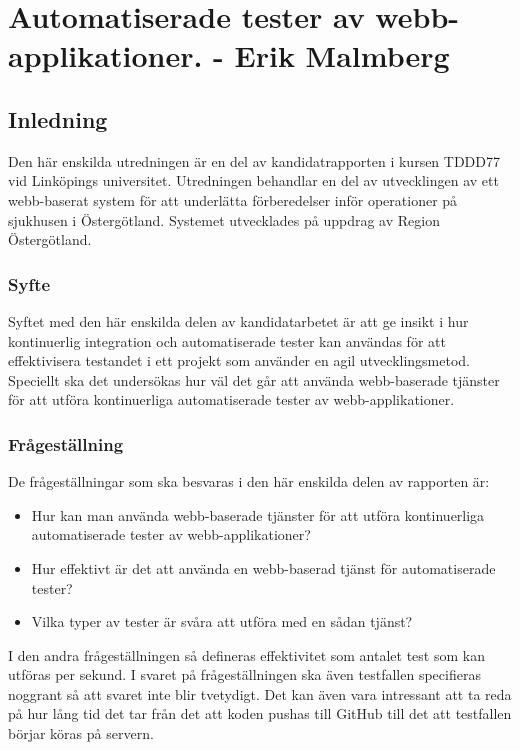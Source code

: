 \section{Automatiserade tester av webb-applikationer. - Erik Malmberg}
\subsection{Inledning}
Den här enskilda utredningen är en del av kandidatrapporten i kursen TDDD77 vid Linköpings universitet.
Utredningen behandlar en del av utvecklingen av ett webb-baserat system för att underlätta förberedelser
inför operationer på sjukhusen i Östergötland. Systemet utvecklades på uppdrag av Region Östergötland.

\subsubsection{Syfte}
Syftet med den här enskilda delen av kandidatarbetet är att ge insikt 
i hur kontinuerlig integration och 
automatiserade tester kan användas för att effektivisera testandet 
i ett projekt som använder en agil 
utvecklingsmetod. Speciellt ska det undersökas hur väl det går att använda 
webb-baserade tjänster för
att utföra kontinuerliga automatiserade tester av webb-applikationer.

\subsubsection{Frågeställning}
De frågeställningar som ska besvaras i den här enskilda 
delen av rapporten är:

\begin{itemize}
\item Hur kan man använda webb-baserade tjänster för
att utföra kontinuerliga automatiserade tester av webb-applikationer?
\item Hur effektivt är det att använda en webb-baserad tjänst
för automatiserade tester? 
\item Vilka typer av tester är svåra att utföra med en sådan tjänst?
\end{itemize}

I den andra frågeställningen så defineras effektivitet som antalet test som kan
utföras per sekund. I svaret på frågeställningen ska även testfallen 
specifieras noggrant så att svaret inte blir tvetydigt. Det kan även vara
intressant att ta reda på hur lång tid det tar från det att koden pushas till GitHub
till det att testfallen börjar köras på servern.

